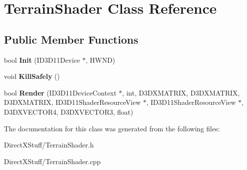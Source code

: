 \hypertarget{class_terrain_shader}{\section{Terrain\-Shader Class Reference}
\label{class_terrain_shader}
}
\subsection*{Public Member Functions}
\begin{DoxyCompactItemize}
\item 
\hypertarget{class_terrain_shader_ad2256e6a508c84177c8ee6bf51ce2b2e}{bool {\bfseries Init} (I\-D3\-D11\-Device $\ast$, H\-W\-N\-D)}\label{class_terrain_shader_ad2256e6a508c84177c8ee6bf51ce2b2e}

\item 
\hypertarget{class_terrain_shader_a56c544b36e30375a57ab3eb142dd0c3b}{void {\bfseries Kill\-Safely} ()}\label{class_terrain_shader_a56c544b36e30375a57ab3eb142dd0c3b}

\item 
\hypertarget{class_terrain_shader_afded87f75b7085df9fe4bbbdf157ad7f}{bool {\bfseries Render} (I\-D3\-D11\-Device\-Context $\ast$, int, D3\-D\-X\-M\-A\-T\-R\-I\-X, D3\-D\-X\-M\-A\-T\-R\-I\-X, D3\-D\-X\-M\-A\-T\-R\-I\-X, I\-D3\-D11\-Shader\-Resource\-View $\ast$, I\-D3\-D11\-Shader\-Resource\-View $\ast$, D3\-D\-X\-V\-E\-C\-T\-O\-R4, D3\-D\-X\-V\-E\-C\-T\-O\-R3, float)}\label{class_terrain_shader_afded87f75b7085df9fe4bbbdf157ad7f}

\end{DoxyCompactItemize}


The documentation for this class was generated from the following files\-:\begin{DoxyCompactItemize}
\item 
Direct\-X\-Stuff/Terrain\-Shader.\-h\item 
Direct\-X\-Stuff/Terrain\-Shader.\-cpp\end{DoxyCompactItemize}
